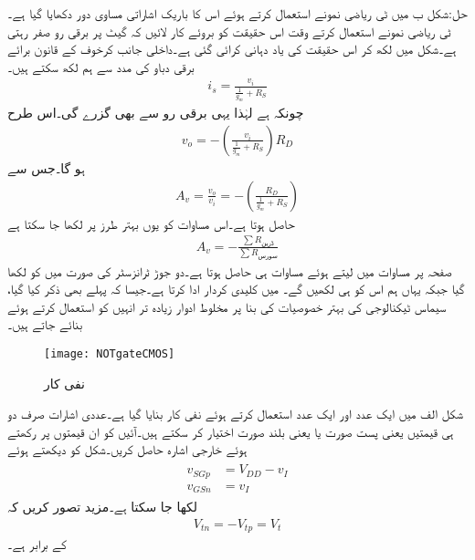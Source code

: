 حل:شکل  ب میں ٹی ریاضی نمونے استعمال کرتے ہوئے اس کا باریک اشاراتی مساوی دور دکھایا گیا ہے۔ٹی ریاضی نمونے استعمال کرتے وقت اس حقیقت کو بروئے کار لائیں کہ گیٹ پر برقی رو صفر رہتی ہے۔شکل میں  لکھ کر اس حقیقت کی یاد دہانی کرائی گئی ہے۔داخلی جانب کرخوف کے قانون برائے برقی دباو کی مدد سے ہم لکھ سکتے ہیں۔
\begin{align*}
i_s=\frac{v_i}{\frac{1}{g_m}+R_S}
\end{align*}
چونکہ  ہے لہٰذا یہی برقی رو  سے بھی گزرے گی۔اس طرح
\begin{align*}
v_o=-\left(\frac{v_i}{\frac{1}{g_m}+R_S} \right) R_D
\end{align*}
ہو گا۔جس سے
\begin{align}
A_v=\frac{v_o}{v_i}=-\left(\frac{R_D}{\frac{1}{g_m}+R_S} \right) 
\end{align}
حاصل ہوتا ہے۔اس مساوات کو یوں بہتر طرز پر لکھا جا سکتا ہے
\begin{align}\label{مساوات_ماسفیٹ_افزائش_بطور_مزاحت_کی_شرح}
A_v=-\frac{\sum R_{\text{ڈرین}}}{\sum R_{\text{سورس}}}
\end{align}
صفحہ  پر مساوات  میں  لیتے ہوئے مساوات  ہی حاصل ہوتا ہے۔دو جوڑ ٹرانزسٹر کی صورت میں  کو  لکھا گیا جبکہ یہاں  ہم اس کو  ہی لکھیں گے۔
 میں  کلیدی کردار ادا کرتا ہے۔جیسا کہ پہلے بھی ذکر کیا گیا، سیماس ٹیکنالوجی کی بہتر خصوصیات کی بنا پر مخلوط ادوار زیادہ تر انہیں کو استعمال کرتے ہوئے بنائے جاتے ہیں۔ 
\begin{figure}
\centering
\texttt{[image: NOTgateCMOS]}
\caption{نفی کار}
\label{شکل_ماسفیٹ_نفی_کار_الف}
\end{figure}

شکل   الف میں ایک عدد  اور ایک عدد  استعمال کرتے ہوئے  نفی کار بنایا گیا ہے۔عددی اشارات صرف دو ہی قیمتیں  یعنی پست صورت  یا  یعنی بلند صورت اختیار کر سکتے ہیں۔آئیں  کو ان قیمتوں پر رکھتے ہوئے خارجی اشارہ  حاصل کریں۔شکل کو دیکھتے ہوئے
\begin{gather}
\begin{aligned}\label{مساوات_ماسفیٹ_ناٹ_گیٹ_الف}
v_{SGp}&=V_{DD}-v_I\\
v_{GSn}&=v_I
\end{aligned}
\end{gather}
لکھا جا سکتا ہے۔مزید تصور کریں کہ 
\begin{align}
V_{tn}=-V_{tp}=V_t
\end{align}
کے برابر ہے۔

